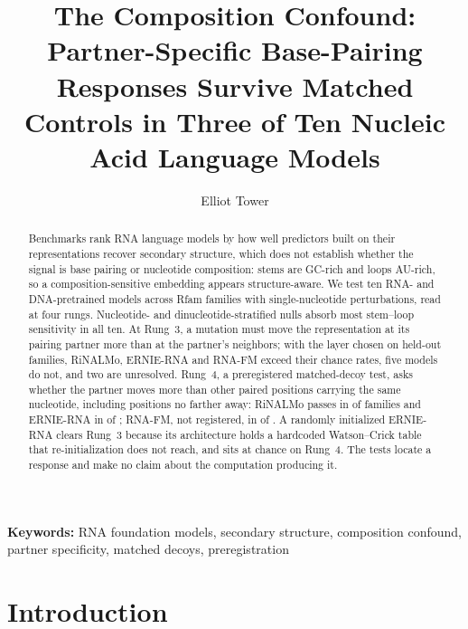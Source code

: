 \documentclass[11pt]{article}
\title{The Composition Confound:\\Partner-Specific Base-Pairing Responses Survive Matched\\Controls in Three of Ten Nucleic Acid Language Models}
\author{Elliot Tower}
\affil{Independent researcher \\ \texttt{elliot@elliottower.ai}}
\date{}
\begin{document}
\maketitle

\noindent\textbf{Keywords:} RNA foundation models, secondary structure, composition confound, partner specificity, matched decoys, preregistration

\begin{abstract}
Benchmarks rank RNA language models by how well predictors built on their
representations recover secondary structure, which does not establish whether
the signal is base pairing or nucleotide composition: stems are GC-rich and
loops AU-rich, so a composition-sensitive embedding appears structure-aware. We
test ten RNA- and DNA-pretrained models across \panelN{} Rfam families with
single-nucleotide perturbations, read at four rungs. Nucleotide- and
dinucleotide-stratified nulls absorb most stem--loop sensitivity in all ten. At Rung~3, a mutation must move the
representation at its pairing partner more than at the partner's neighbors;
with the layer chosen on held-out families, RiNALMo, ERNIE-RNA and RNA-FM
exceed their chance rates, five models do not, and two are unresolved.
Rung~4, a preregistered matched-decoy test, asks whether the partner moves more
than other paired positions carrying the same nucleotide, including positions
no farther away: RiNALMo passes in \decoyAllAboveRiNALMo{} of
\decoyAllFamiliesRiNALMo{} families and ERNIE-RNA in \decoyAllAboveErnieRNA{}
of \decoyAllFamiliesErnieRNA{}; RNA-FM, not registered, in
\decoyAllAboveRNAFM{} of \decoyAllFamiliesRNAFM{}. A randomly initialized
ERNIE-RNA clears Rung~3 because its architecture holds a hardcoded
Watson--Crick table that re-initialization does not reach, and sits at chance
on Rung~4. The tests locate a response and make no claim about the
computation producing it.
\end{abstract}

\section{Introduction}
\label{sec:intro}
\end{document}
